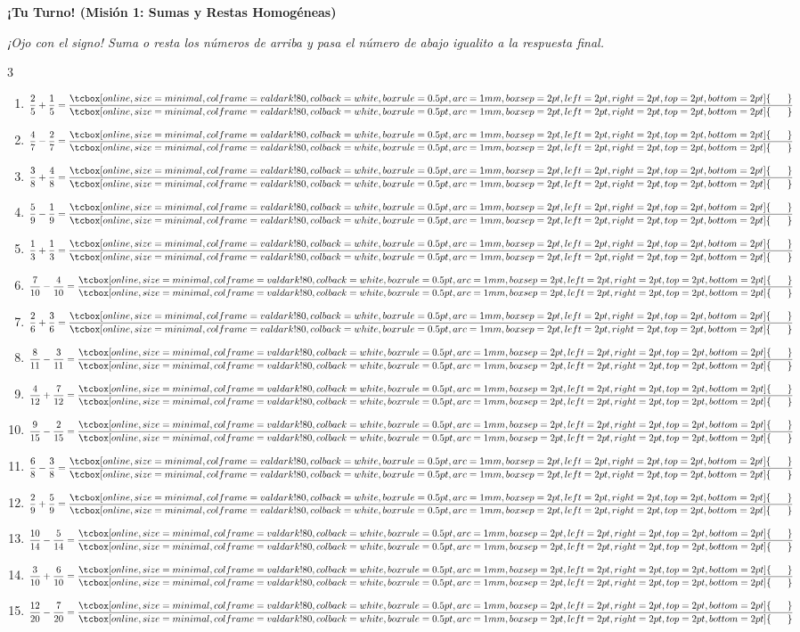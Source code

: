 \documentclass[12pt, letterpaper]{article}
\newenvironment{practica}[1]{
	\vspace{0.6cm}
	\begin{tcolorbox}[colback=white, colframe=valdark, boxrule=1pt, borderline west={4pt}{0pt}{valdark!50}, arc=2mm, top=3pt, bottom=3pt]
		\large\bfseries \ding{46} \textbf{¡Tu Turno! (#1)}
	\end{tcolorbox}
	\vspace{0.2cm}
}{
	\vspace{0.4cm}
}
\newcommand{\boxfill}[1][0.6cm]{\tcbox[on line, size=minimal, colframe=valdark!80, colback=white, boxrule=0.5pt, arc=1mm, boxsep=2pt, left=2pt, right=2pt, top=2pt, bottom=2pt]{\makebox[#1]{\vphantom{M}}}}
\begin{document}
	\begin{practica}{Misión 1: Sumas y Restas Homogéneas}
		\textit{¡Ojo con el signo! Suma o resta los números de arriba y pasa el número de abajo igualito a la respuesta final.}
		
		\vspace{0.4cm}
		\begin{multicols}{3}
			\raggedcolumns
			\begin{enumerate}[itemsep=0.8cm, leftmargin=*]
				\item $\dfrac{2}{5} + \dfrac{1}{5} = \dfrac{\boxfill[0.6cm]}{\boxfill[0.6cm]}$
				
				\item $\dfrac{4}{7} - \dfrac{2}{7} = \dfrac{\boxfill[0.6cm]}{\boxfill[0.6cm]}$
				
				\item $\dfrac{3}{8} + \dfrac{4}{8} = \dfrac{\boxfill[0.6cm]}{\boxfill[0.6cm]}$
				
				\item $\dfrac{5}{9} - \dfrac{1}{9} = \dfrac{\boxfill[0.6cm]}{\boxfill[0.6cm]}$
				
				\item $\dfrac{1}{3} + \dfrac{1}{3} = \dfrac{\boxfill[0.6cm]}{\boxfill[0.6cm]}$
				
				\item $\dfrac{7}{10} - \dfrac{4}{10} = \dfrac{\boxfill[0.6cm]}{\boxfill[0.6cm]}$
				
				\item $\dfrac{2}{6} + \dfrac{3}{6} = \dfrac{\boxfill[0.6cm]}{\boxfill[0.6cm]}$
				
				\item $\dfrac{8}{11} - \dfrac{3}{11} = \dfrac{\boxfill[0.6cm]}{\boxfill[0.6cm]}$
				
				\item $\dfrac{4}{12} + \dfrac{7}{12} = \dfrac{\boxfill[0.6cm]}{\boxfill[0.6cm]}$
				
				\item $\dfrac{9}{15} - \dfrac{2}{15} = \dfrac{\boxfill[0.6cm]}{\boxfill[0.6cm]}$
				
				\item $\dfrac{6}{8} - \dfrac{3}{8} = \dfrac{\boxfill[0.6cm]}{\boxfill[0.6cm]}$
				
				\item $\dfrac{2}{9} + \dfrac{5}{9} = \dfrac{\boxfill[0.6cm]}{\boxfill[0.6cm]}$
				
				\item $\dfrac{10}{14} - \dfrac{5}{14} = \dfrac{\boxfill[0.6cm]}{\boxfill[0.6cm]}$
				
				\item $\dfrac{3}{10} + \dfrac{6}{10} = \dfrac{\boxfill[0.6cm]}{\boxfill[0.6cm]}$
				
				\item $\dfrac{12}{20} - \dfrac{7}{20} = \dfrac{\boxfill[0.6cm]}{\boxfill[0.6cm]}$
			\end{enumerate}
		\end{multicols}
	\end{practica}
	
\end{document}
